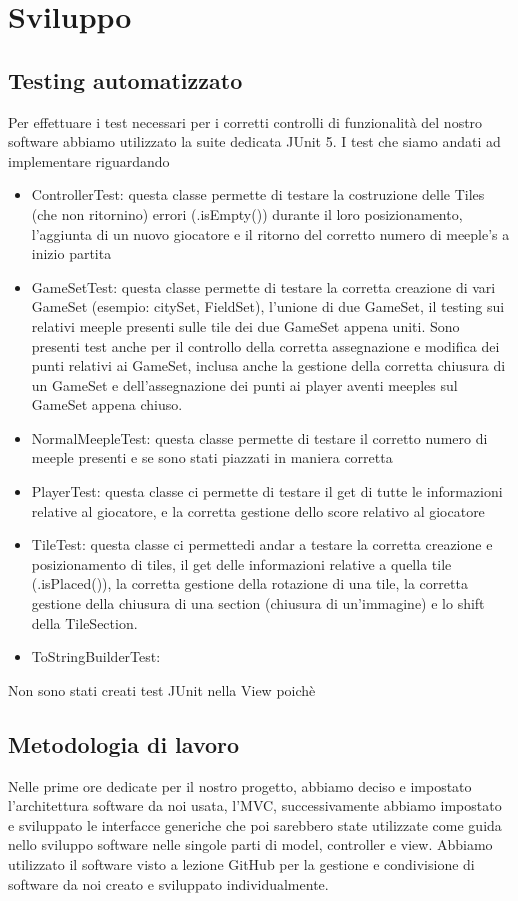 \section{Sviluppo}
\subsection{Testing automatizzato}
Per effettuare i test necessari per i corretti controlli di funzionalità del nostro software abbiamo utilizzato la suite dedicata JUnit 5. I test che siamo andati ad implementare riguardando
\begin{itemize}
    \item ControllerTest: questa classe permette di testare la costruzione delle Tiles (che non ritornino) errori (.isEmpty()) durante il loro posizionamento, l'aggiunta di un nuovo giocatore e il ritorno del corretto numero di meeple's a inizio partita
    \item GameSetTest: questa classe permette di testare la corretta creazione di vari GameSet (esempio: citySet, FieldSet), l'unione di due GameSet, il testing sui relativi meeple presenti sulle tile dei due GameSet appena uniti. Sono presenti test anche per il controllo della corretta assegnazione e modifica dei punti relativi ai GameSet, inclusa anche la gestione della corretta chiusura di un GameSet e dell'assegnazione dei punti ai player aventi meeples sul GameSet appena chiuso. 
    \item NormalMeepleTest: questa classe permette di testare il corretto numero di meeple presenti e se sono stati piazzati in maniera corretta
    \item PlayerTest: questa classe ci permette di testare il get di tutte le informazioni relative al giocatore, e la corretta gestione dello score relativo al giocatore
    \item TileTest: questa classe ci permettedi andar a testare la corretta creazione e posizionamento di tiles, il get delle informazioni relative a quella tile (.isPlaced()), la corretta gestione della rotazione di una tile, la corretta gestione della chiusura di una section (chiusura di un'immagine) e lo shift della TileSection.
    \item ToStringBuilderTest:
\end{itemize}
Non sono stati creati test JUnit nella View poichè 

\subsection{Metodologia di lavoro}
Nelle prime ore dedicate per il nostro progetto, abbiamo deciso e impostato l'architettura software da noi usata, l'MVC, successivamente abbiamo impostato e sviluppato le interfacce generiche che poi sarebbero state utilizzate come guida nello sviluppo software nelle singole parti di model, controller e view. Abbiamo utilizzato il software visto a lezione GitHub per la gestione e condivisione di software da noi creato e sviluppato individualmente.
